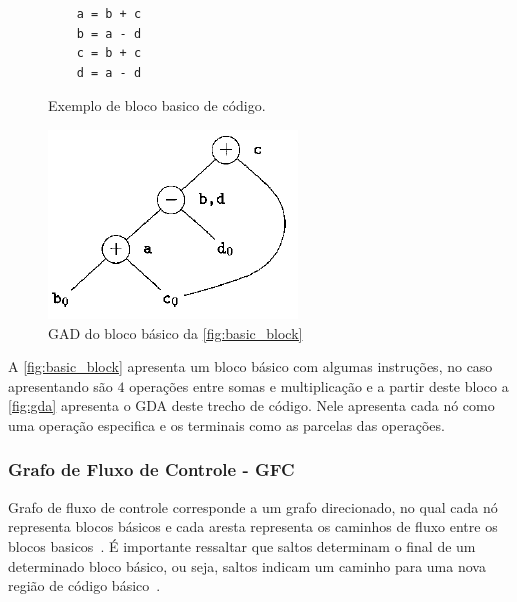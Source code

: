 \par
\begin{figure}[thp]
\caption{\label{fig:basic_block} Exemplo de bloco basico de código.}
	\begin{center}
    \begin{minipage}{0.9\textwidth}
    \begin{lstlisting}
    a = b + c
    b = a - d
    c = b + c
    d = a - d
	\end{lstlisting}
    \end{minipage}
	\end{center}
\end{figure}

\begin{figure}[htb]
	\begin{center}
    \caption{\label{fig:gda}GAD do bloco básico da \autoref{fig:basic_block}}
	\includegraphics[scale=0.70]{Figuras/GDA.png}
	\end{center}
\end{figure}

A \autoref{fig:basic_block} apresenta um bloco básico com algumas instruções, no caso apresentando são $4$ operações entre somas e multiplicação e a partir deste bloco a \autoref{fig:gda} apresenta o GDA deste trecho de código. Nele apresenta cada nó como uma operação especifica e os terminais como as parcelas das operações.


\subsubsection{Grafo de Fluxo de Controle - GFC}


Grafo de fluxo de controle corresponde a um grafo direcionado, no qual cada nó representa blocos básicos e cada aresta representa os caminhos de fluxo entre os blocos basicos~\cite{allen1970control}. É importante ressaltar que saltos determinam o final de um determinado bloco básico, ou seja, saltos indicam um caminho para uma nova região de código básico~\cite{aho2007compilers}.

